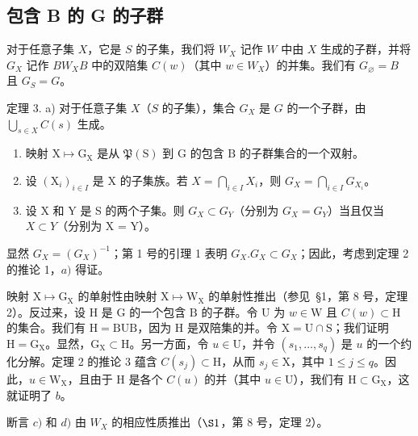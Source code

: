 \subsection{包含 B 的 G 的子群}

对于任意子集 \(X\)，它是 \(S\) 的子集，我们将 \(W_X\) 记作 \(W\) 中由 \(X\) 生成的子群，并将 \(G_X\) 记作 \(BW_X B\) 中的双陪集 \(C(w)\)（其中 \(w \in W_X\)）的并集。我们有 \(G_\varnothing = B\) 且 \(G_S = G\)。

定理 3. a) 对于任意子集 \(X\)（\(S\) 的子集），集合 \(G_X\) 是 \(G\) 的一个子群，由 \(\bigcup_{s \in X} C(s)\) 生成。

\begin{enumerate}
\def\labelenumi{\alph{enumi})}
\setcounter{enumi}{1}
\item
  映射 \(\mathrm{X} \mapsto \mathrm{G}_{\mathrm{X}}\) 是从 \(\mathfrak{P}(\mathrm{S})\) 到 \(\mathrm{G}\) 的包含 \(\mathrm{B}\) 的子群集合的一个双射。
\item
  设 \((\mathrm{X}_i)_{i\in I}\) 是 X 的子集族。若 \(X = \bigcap_{i\in I}X_i\)，则 \(G_X = \bigcap_{i\in I}G_{X_i}\)。
\item
  设 X 和 Y 是 S 的两个子集。则 \(G_{X} \subset G_{Y}\)（分别为 \(G_{X} = G_{Y}\)）当且仅当 \(X \subset Y\)（分别为 X = Y）。
\end{enumerate}

显然 \(G_{X} = (G_{X})^{-1}\)；第 1 号的引理 1 表明 \(G_{X}.G_{X} \subset G_{X}\)；因此，考虑到定理 2 的推论 1，\(a)\) 得证。

映射 \(\mathrm{X} \mapsto \mathrm{G}_{\mathrm{X}}\) 的单射性由映射 \(\mathrm{X} \mapsto \mathrm{W}_{\mathrm{X}}\) 的单射性推出（参见~§1，第 8 号，定理 2）。反过来，设 \(\mathrm{H}\) 是 \(\mathrm{G}\) 的一个包含 \(\mathrm{B}\) 的子群。令 \(\mathrm{U}\) 为 \(w \in \mathrm{W}\) 且 \(C(w) \subset \mathrm{H}\) 的集合。我们有 \(\mathrm{H} = \mathrm{BUB}\)，因为 \(\mathrm{H}\) 是双陪集的并。令 \(\mathrm{X} = \mathrm{U} \cap \mathrm{S}\)；我们证明 \(\mathrm{H} = \mathrm{G}_{\mathrm{X}}\)。显然，\(\mathrm{G}_{\mathrm{X}} \subset \mathrm{H}\)。另一方面，令 \(u \in \mathrm{U}\)，并令 \((s_1, \ldots, s_q)\) 是 \(u\) 的一个约化分解。定理 2 的推论 3 蕴含 \(C(s_j) \subset \mathrm{H}\)，从而 \(s_j \in \mathrm{X}\)，其中 \(1 \leqslant j \leqslant q\)。因此，\(u \in \mathrm{W}_{\mathrm{X}}\)，且由于 \(\mathrm{H}\) 是各个 \(C(u)\) 的并（其中 \(u \in \mathrm{U}\)），我们有 \(\mathrm{H} \subset \mathrm{G}_{\mathrm{X}}\)，这就证明了 \(b\)。

断言 \(c)\) 和 \(d)\) 由 \(W_X\) 的相应性质推出（\(\S 1\)，第 8 号，定理 2）。

